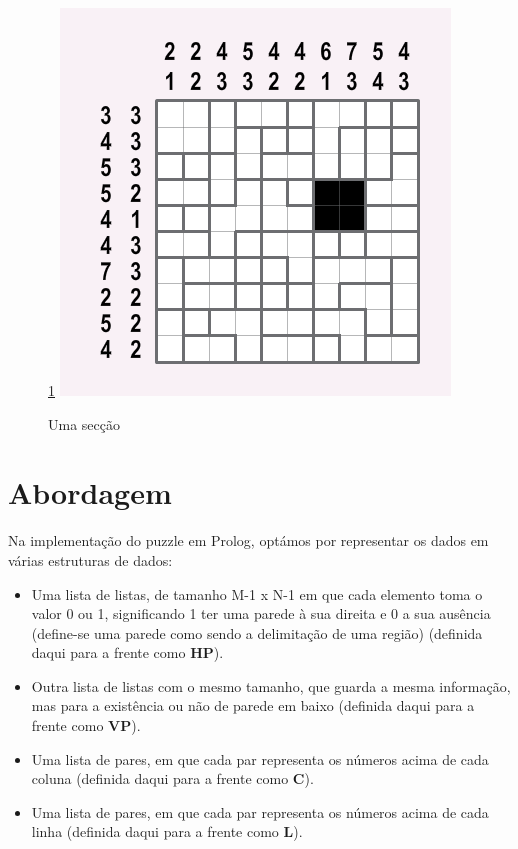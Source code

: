 \documentclass[runningheads,a4paper]{llncs}
\begin{document}
\begin{figure}[h]
\ref{fig:section}
\centering
\includegraphics[scale=0.5]{res/section.png}
\caption{Uma secção}
\label{fig:section}
\end{figure}

\section{Abordagem}

Na implementação do puzzle em Prolog, optámos por representar os dados em várias estruturas de dados:

\begin{itemize}
\item Uma lista de listas, de tamanho M-1 x N-1 em que cada elemento toma o valor 0 ou 1, significando 1 ter uma parede à sua direita e 0 a sua ausência (define-se uma parede como sendo a delimitação de uma região) (definida daqui para a frente como \textbf{HP}).
\item Outra lista de listas com o mesmo tamanho, que guarda a mesma informação, mas para a existência ou não de parede em baixo (definida daqui para a frente como \textbf{VP}).
\item Uma lista de pares, em que cada par representa os números acima de cada coluna (definida daqui para a frente como \textbf{C}).
\item Uma lista de pares, em que cada par representa os números acima de cada linha (definida daqui para a frente como \textbf{L}).
\end{itemize}
\end{document}
